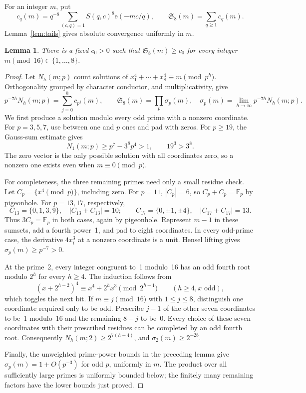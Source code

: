 \documentclass[11pt]{article}
\newtheorem{lemma}{Lemma}
\theoremstyle{remark}\newtheorem*{remark}{Remark}
\newcommand{\e}{\mathrm e}
\newcommand{\SSS}{\mathfrak S}
\begin{document}
For an integer \(m\), put
\[
 c_q(m)=q^{-8}\sum_{(c,q)=1}S(q,c)^8\e(-mc/q),\qquad
 \SSS_8(m)=\sum_{q\ge1}c_q(m).
\]
Lemma~\ref{lem:tails} gives absolute convergence uniformly in \(m\).
\begin{lemma}\label{lem:local}
There is a fixed \(c_0>0\) such that
\(\SSS_8(m)\ge c_0\) for every integer
\(m\pmod{16}\in\{1,\ldots,8\}\).
\end{lemma}
\begin{proof}
Let \(N_h(m;p)\) count solutions of
\(x_1^4+\cdots+x_8^4\equiv m\pmod{p^h}\).
Orthogonality grouped by character conductor, and multiplicativity, give
\[
 p^{-7h}N_h(m;p)=\sum_{j=0}^h c_{p^j}(m),\qquad
 \SSS_8(m)=\prod_p\sigma_p(m),\quad
 \sigma_p(m)=\lim_{h\to\infty}p^{-7h}N_h(m;p).
\]
We first produce a solution modulo every odd prime with a nonzero coordinate.
For \(p=3,5,7\), use between one and \(p\) ones and pad with zeros.
For \(p\ge19\), the Gauss-sum estimate gives
\[
 N_1(m;p)\ge p^7-3^8p^4>1,
 \qquad19^3>3^8.
\]
The zero vector is the only possible solution with all coordinates zero,
so a nonzero one exists even when \(m\equiv0\pmod p\).

For completeness, the three remaining primes need only a small residue check.
Let \(C_p=\{x^4\pmod p\}\), including zero.
For \(p=11\), \(|C_p|=6\), so \(C_p+C_p=\mathbb F_p\) by
pigeonhole. For \(p=13,17\), respectively,
\[
 C_{13}=\{0,1,3,9\},\quad |C_{13}+C_{13}|=10;
 \qquad C_{17}=\{0,\pm1,\pm4\},\quad |C_{17}+C_{17}|=13.
\]
Thus \(3C_p=\mathbb F_p\) in both cases, again by pigeonhole.
Represent \(m-1\) in these sumsets, add a fourth power~1, and pad to
eight coordinates. In every odd-prime case, the derivative \(4x_i^3\)
at a nonzero coordinate is a unit. Hensel lifting gives
\(\sigma_p(m)\ge p^{-7}>0\).

At the prime~2, every integer congruent to~1 modulo~16 has an odd fourth
root modulo \(2^h\) for every \(h\ge4\). The induction follows from
\[
 (x+2^{h-2})^4\equiv x^4+2^h x^3\pmod{2^{h+1}}
 \qquad(h\ge4, x\text{ odd}),
\]
which toggles the next bit. If \(m\equiv j\pmod{16}\) with
\(1\le j\le8\), distinguish one coordinate required only to be odd.
Prescribe \(j-1\) of the other seven coordinates to be~1 modulo~16 and
the remaining \(8-j\) to be~0. Every choice of these seven coordinates
with their prescribed residues can be completed by an odd fourth root.
Consequently \(N_h(m;2)\ge2^{7(h-4)}\), and
\(\sigma_2(m)\ge2^{-28}\).

Finally, the unweighted prime-power bounds in the preceding lemma give
\(\sigma_p(m)=1+O(p^{-3})\) for odd \(p\), uniformly in \(m\).
The product over all sufficiently large primes is uniformly bounded below;
the finitely many remaining factors have the lower bounds just proved.
\end{proof}
\end{document}
